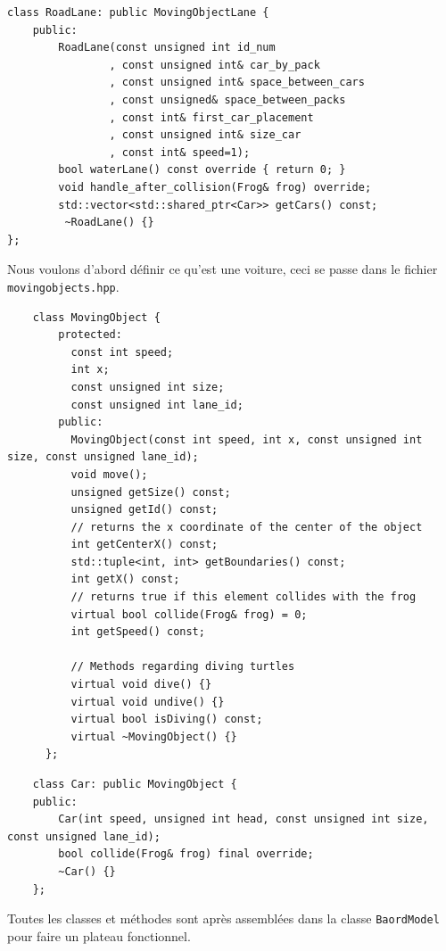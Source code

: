 \documentclass[a4paper, 12pt]{article}
\begin{document}
\begin{lstlisting}
class RoadLane: public MovingObjectLane {
    public:
        RoadLane(const unsigned int id_num
                , const unsigned int& car_by_pack
                , const unsigned int& space_between_cars
                , const unsigned& space_between_packs
                , const int& first_car_placement
                , const unsigned int& size_car
                , const int& speed=1);
        bool waterLane() const override { return 0; }
        void handle_after_collision(Frog& frog) override;
        std::vector<std::shared_ptr<Car>> getCars() const;
         ~RoadLane() {}
};
\end{lstlisting}

Nous voulons d'abord définir ce qu'est une voiture, ceci se passe dans le fichier \texttt{movingobjects.hpp}. \\

\begin{lstlisting}
    class MovingObject {
        protected:
          const int speed;
          int x;
          const unsigned int size;
          const unsigned int lane_id;
        public:
          MovingObject(const int speed, int x, const unsigned int size, const unsigned lane_id);
          void move();
          unsigned getSize() const;
          unsigned getId() const;
          // returns the x coordinate of the center of the object
          int getCenterX() const;
          std::tuple<int, int> getBoundaries() const;
          int getX() const;
          // returns true if this element collides with the frog
          virtual bool collide(Frog& frog) = 0;
          int getSpeed() const;
      
          // Methods regarding diving turtles
          virtual void dive() {}
          virtual void undive() {}
          virtual bool isDiving() const;
          virtual ~MovingObject() {}
      };
\end{lstlisting}

\begin{lstlisting}
    class Car: public MovingObject {
    public:
        Car(int speed, unsigned int head, const unsigned int size, const unsigned lane_id);
        bool collide(Frog& frog) final override;
        ~Car() {}
    };
\end{lstlisting}

Toutes les classes et méthodes sont après assemblées dans la classe \texttt{BaordModel} pour faire un plateau fonctionnel. \\
\end{document}
